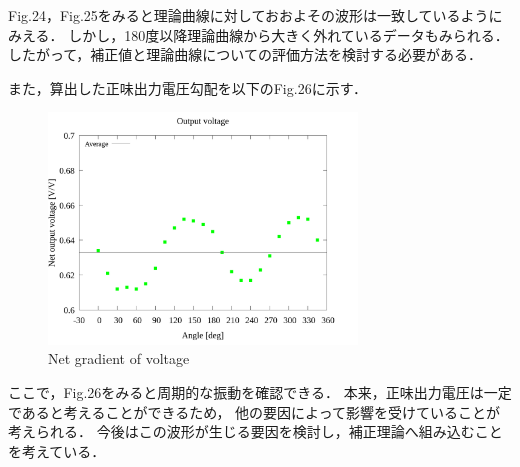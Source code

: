 \documentclass[twocolumn,a4j]{jsarticle}
\begin{document}
Fig.24，Fig.25をみると理論曲線に対しておおよその波形は一致しているようにみえる．
しかし，180度以降理論曲線から大きく外れているデータもみられる．
したがって，補正値と理論曲線についての評価方法を検討する必要がある．

\newpage

また，算出した正味出力電圧勾配を以下のFig.26に示す．

\begin{figure}[htbp]
    \begin{center}
        \includegraphics[width=82mm]{../../../02_workspace/result/2-ex/plot/09/09_summary-outputvoltage-net.png}
        \caption{Net gradient of voltage}
    \end{center}
\end{figure}

ここで，Fig.26をみると周期的な振動を確認できる．
本来，正味出力電圧は一定であると考えることができるため，
他の要因によって影響を受けていることが考えられる．
今後はこの波形が生じる要因を検討し，補正理論へ組み込むことを考えている．
\end{document}
